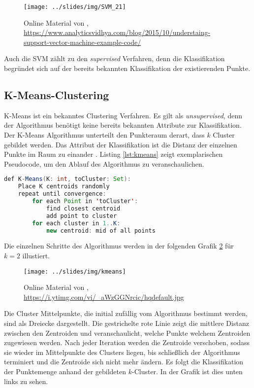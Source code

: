 \begin{figure}[h]
    \centering
    \texttt{[image: ../slides/img/SVM\_21]}
    \caption{Online Material von \cite{ray2015}, \url{https://www.analyticsvidhya.com/blog/2015/10/understaing-support-vector-machine-example-code/}\label{fig:svm}}
\end{figure}

Auch die SVM zählt zu den \textit{supervised} Verfahren, denn die Klassifikation begründet sich auf der bereits bekannten Klassifikation der existierenden Punkte.

\subsection{K-Means-Clustering}

K-Means ist ein bekanntes Clustering Verfahren. Es gilt als \textit{unsupervised}, denn der Algorithmus benötigt keine bereits bekannten Attribute zur Klassifikation. Der K-Means Algorithmus unterteilt den Punkteraum derart, dass $k$ Cluster gebildet werden. Das Attribut der Klassifikation ist die Distanz der einzelnen Punkte im Raum zu einander \cite{datamining2011}. Listing \ref{lst:kmeans} zeigt exemplarischen Pseudocode, um den Ablauf des Algorithmus zu veranschaulichen.

\begin{center}
\begin{lstlisting}[caption={K-Means Algorithmus \cite{lavrenko2013}},label=lst:kmeans,language=JAVA,label={lst:kmeans}]
def K-Means(K: int, toCluster: Set):
    Place K centroids randomly
    repeat until convergence:
        for each Point in 'toCluster':
            find closest centroid
            add point to cluster
        for each cluster in 1..K:
            new centroid: mid of all points
\end{lstlisting}
\end{center}

Die einzelnen Schritte des Algorithmus werden in der folgenden Grafik \ref{fig:kmeans} für $k = 2$ illustiert.

\begin{figure}[h]
    \centering
    \texttt{[image: ../slides/img/kmeans]}
    \caption{Online Material von \cite{lavrenko2013}, \url{https://i.ytimg.com/vi/_aWzGGNrcic/hqdefault.jpg}\label{fig:kmeans}}
\end{figure}

Die Cluster Mittelpunkte, die initial zufällig vom Algorithmus bestimmt werden, sind als Dreiecke dargestellt. Die gestrichelte rote Linie zeigt die mittlere Distanz zwischen den Zentroiden und veranschaulicht, welche Punkte welchem Zentroiden zugewiesen werden. Nach jeder Iteration werden die Zentroide verschoben, sodass sie wieder im Mittelpunkte des Clusters liegen, bis schließlich der Algorithmus terminiert und die Zentroide sich nicht mehr ändern. Es folgt die Klassifikation der Punktemenge anhand der gebildeten $k$-Cluster. In der Grafik ist dies unten links zu sehen.